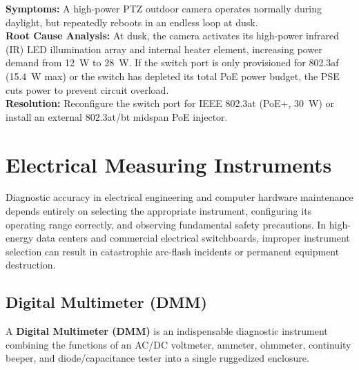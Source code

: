 \begin{tcolorbox}[colback=white,colframe=titleblue,title=\textbf{Scenario 3: Outdoor IP Surveillance Camera Repeatedly Reboots}]
\textbf{Symptoms:} A high-power PTZ outdoor camera operates normally during daylight, but repeatedly reboots in an endless loop at dusk. \\
\textbf{Root Cause Analysis:} At dusk, the camera activates its high-power infrared (IR) LED illumination array and internal heater element, increasing power demand from 12~W to 28~W. If the switch port is only provisioned for 802.3af (15.4~W max) or the switch has depleted its total PoE power budget, the PSE cuts power to prevent circuit overload. \\
\textbf{Resolution:} Reconfigure the switch port for IEEE 802.3at (PoE+, 30~W) or install an external 802.3at/bt midspan PoE injector.
\end{tcolorbox}

\section{Electrical Measuring Instruments}

Diagnostic accuracy in electrical engineering and computer hardware maintenance depends entirely on selecting the appropriate instrument, configuring its operating range correctly, and observing fundamental safety precautions. In high-energy data centers and commercial electrical switchboards, improper instrument selection can result in catastrophic arc-flash incidents or permanent equipment destruction.

\subsection{Digital Multimeter (DMM)}
A \textbf{Digital Multimeter (DMM)} is an indispensable diagnostic instrument combining the functions of an AC/DC voltmeter, ammeter, ohmmeter, continuity beeper, and diode/capacitance tester into a single ruggedized enclosure.

